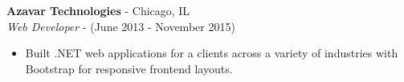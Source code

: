 \documentclass[10pt]{article}
\begin{document}
\begin{paracol}{2}
    \noindent \textbf{Azavar Technologies} - Chicago, IL \\
    \textit{Web Developer} - {\footnotesize(June 2013 - November 2015)}
    \begin{itemize}
        \item Built .NET web applications for a clients across a variety of industries with Bootstrap for responsive frontend layouts.
    \end{itemize}

\end{paracol}
\end{document}
